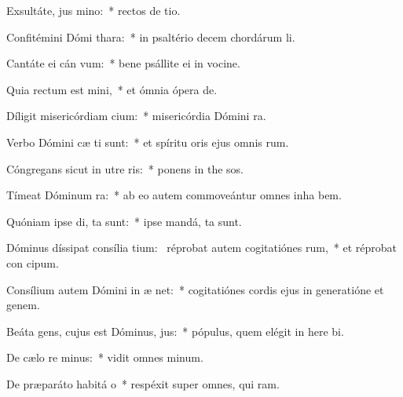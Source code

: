 \item Exsultáte, jus  mino:~* rectos de tio.
\item Confitémini Dómi  thara:~* in psaltério decem chordárum  li.
\item Cantáte ei cán vum:~* bene psállite ei in vocine.
\item Quia rectum est  mini,~* et ómnia ópera   de.
\item Díligit misericórdiam  cium:~* misericórdia Dómini   ra.
\item Verbo Dómini cæ ti sunt:~* et spíritu oris ejus omnis  rum.
\item Cóngregans sicut in utre  ris:~* ponens in the sos.
\item Tímeat Dóminum  ra:~* ab eo autem commoveántur omnes inha bem.
\item Quóniam ipse di,  ta sunt:~* ipse mandá,  ta sunt.
\item Dóminus díssipat consília tium:~\pscross{} réprobat autem cogitatiónes rum,~* et réprobat con cipum.
\item Consílium autem Dómini in æ net:~* cogitatiónes cordis ejus in generatióne et genem.
\item Beáta gens, cujus est Dóminus,  jus:~* pópulus, quem elégit in here bi.
\item De cælo re minus:~* vidit omnes  minum.
\item De præparáto habitá o~* respéxit super omnes, qui  ram.
